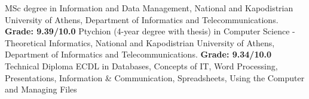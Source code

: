 	\begin{scholarship}
						{MSc degree in Information and Data Management, National and Kapodistrian University of Athens, Department of Informatics and Telecommunications. \textbf{Grade: 9.39/10.0}}
						{Ptychion (4-year degree with thesis) in Computer Science - Theoretical Informatics, National and Kapodistrian University of Athens, Department of Informatics and Telecommunications. \textbf{Grade: 9.34/10.0}}
						{Technical Diploma ECDL in Databases, Concepts of IT, Word Processing, Presentations, Information \& Communication, Spreadsheets, Using the Computer and Managing Files}
	\end{scholarship}
